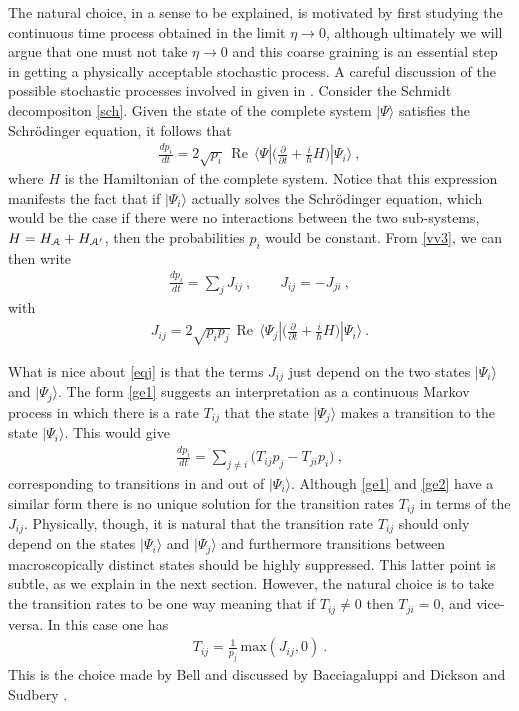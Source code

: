 \documentclass[12pt]{article}
\def\BA{{\EuScript A}}
\newcommand{\RE}{\operatorname{Re}}
\def\bra#1{\langle #1|}
\def\ket#1{| #1\rangle}
\newcommand{\EQ}[1]{\begin{equation}\begin{split} #1
\end{split}\end{equation}}
\begin{document}
The natural choice, in a sense to be explained, is motivated by first studying the 
continuous time process obtained in the limit $\eta\to0$, although ultimately we will argue that 
one must not take $\eta\to0$ and this coarse graining is an essential step in getting a physically acceptable stochastic process. A careful discussion of the possible stochastic processes involved in given in \cite{Bacciagaluppi:1997da}.
Consider the Schmidt decompositon \eqref{sch}.
Given the state of the complete system $\ket{\Psi}$ satisfies the Schr\"odinger equation, it follows that
\EQ{
\frac{dp_i}{dt}=2\sqrt{p_i}\,\RE\,\bra{\Psi}\Big(\frac{\partial}{\partial t}+\frac i\hbar H\Big)\ket{\Psi_i}\ ,
\label{vv3}
}
where $H$ is the Hamiltonian of the complete system. 
Notice that 
this expression manifests the fact that if $\ket{\Psi_i}$ actually solves the Schr\"odinger equation, which would be the case
if there were no interactions between the two sub-systems, $H=H_\BA+H_{\BA'}$, then the probabilities
$p_i$ would be constant.
From \eqref{vv3}, we can then write
\EQ{
\frac{dp_i}{dt}=\sum_jJ_{ij}\ ,\qquad J_{ij}=-J_{ji}\ ,
\label{ge1}
}
with
\EQ{
J_{ij}=2\sqrt{p_ip_j}\,\RE\,\bra{\Psi_j}\Big(\frac{\partial}{\partial t}+\frac i\hbar H\Big)\ket{\Psi_i}\ .
\label{eqj}
}

What is nice about \eqref{eqj} is that the terms $J_{ij}$ just depend on the two states $\ket{\Psi_i}$ and $\ket{\Psi_j}$. The form \eqref{ge1} suggests an interpretation as a continuous Markov process in which there is a rate $T_{ij}$ that the state $\ket{\Psi_j}$ makes a transition to the state $\ket{\Psi_i}$. This would give
\EQ{
\frac{dp_i}{dt}=\sum_{j\neq i}\Big(T_{ij}p_j-T_{ji}p_i\Big)\ ,
\label{ge2}
}
corresponding to transitions in and out of  $\ket{\Psi_i}$. Although \eqref{ge1} and \eqref{ge2} have a similar form there is
no unique solution for the transition rates $T_{ij}$ in terms of the $J_{ij}$. 
Physically, though, it is natural that the transition rate $T_{ij}$ should only depend on the states $\ket{\Psi_i}$ and $\ket{\Psi_j}$ and furthermore
transitions between macroscopically distinct states should be highly suppressed. This latter point is subtle, as we explain in the next section. However, the natural choice is to take the transition rates to be one way meaning that if $T_{ij}\neq0$ then $T_{ji}=0$, and vice-versa. In this case one has 
\EQ{
T_{ij}=\frac1{p_j}\,\text{max}\left(J_{ij},0\right)\ .
\label{trt}
}
This is the choice made by Bell \cite{Bell} and discussed by Bacciagaluppi and Dickson \cite{Bacciagaluppi:1997da} and Sudbery \cite{Sud1}.
\end{document}

